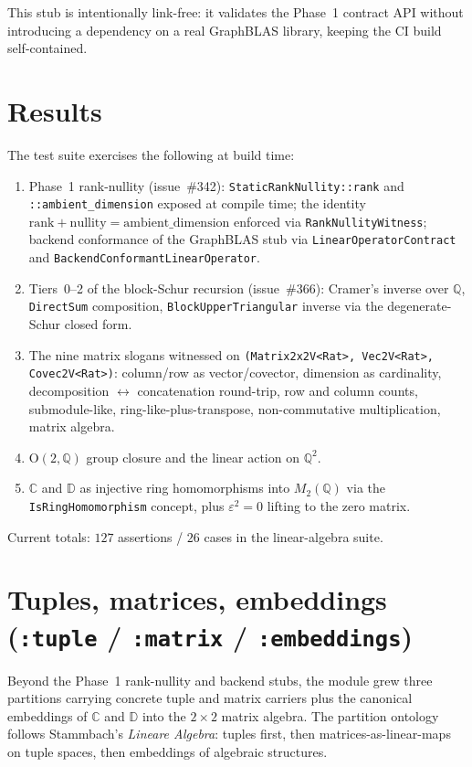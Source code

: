 \documentclass[11pt, a4paper]{report}
\begin{document}
This stub is intentionally link-free: it validates the Phase~1 contract API without introducing a dependency on a real GraphBLAS library, keeping the CI build self-contained.

\section{Results}

The test suite exercises the following at build time:
\begin{enumerate}
  \item Phase~1 rank-nullity (issue~\#342): \texttt{StaticRankNullity::rank} and \texttt{::ambient\_dimension} exposed at compile time; the identity $\text{rank} + \text{nullity} = \text{ambient\_dimension}$ enforced via \texttt{RankNullityWitness}; backend conformance of the GraphBLAS stub via \texttt{LinearOperatorContract} and \texttt{BackendConformantLinearOperator}.
  \item Tiers~0--2 of the block-Schur recursion (issue~\#366): Cramer's inverse over $\mathbb{Q}$, \texttt{DirectSum} composition, \texttt{BlockUpperTriangular} inverse via the degenerate-Schur closed form.
  \item The nine matrix slogans witnessed on \texttt{(Matrix2x2V<Rat>, Vec2V<Rat>, Covec2V<Rat>)}: column/row as vector/covector, dimension as cardinality, decomposition $\leftrightarrow$ concatenation round-trip, row and column counts, submodule-like, ring-like-plus-transpose, non-commutative multiplication, matrix algebra.
  \item $\mathrm{O}(2, \mathbb{Q})$ group closure and the linear action on $\mathbb{Q}^2$.
  \item $\mathbb{C}$ and $\mathbb{D}$ as injective ring homomorphisms into $M_2(\mathbb{Q})$ via the \texttt{IsRingHomomorphism} concept, plus $\varepsilon^2 = 0$ lifting to the zero matrix.
\end{enumerate}
Current totals: $127$ assertions / $26$ cases in the linear-algebra suite.

\section{Tuples, matrices, embeddings (\texttt{:tuple} / \texttt{:matrix} / \texttt{:embeddings})}
\label{sec:linear_algebra-tuple-matrix-embeddings}

Beyond the Phase~1 rank-nullity and backend stubs, the module grew three partitions carrying concrete tuple and matrix carriers plus the canonical embeddings of $\mathbb{C}$ and $\mathbb{D}$ into the $2 \times 2$ matrix algebra. The partition ontology follows Stammbach's \emph{Lineare Algebra}: tuples first, then matrices-as-linear-maps on tuple spaces, then embeddings of algebraic structures.
\end{document}
